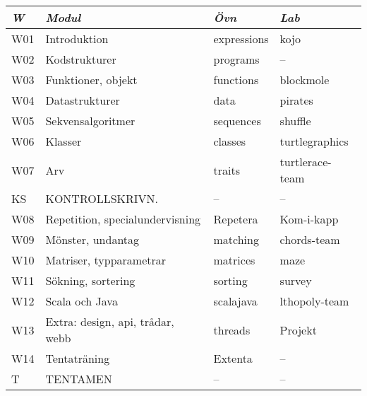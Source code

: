 \begin{tabular}{l|l|l|l}
\textit{W} & \textit{Modul} & \textit{Övn} & \textit{Lab} \\ \hline \hline
W01 & Introduktion & expressions & kojo \\
W02 & Kodstrukturer & programs & -- \\
W03 & Funktioner, objekt & functions & blockmole \\
W04 & Datastrukturer & data & pirates \\
W05 & Sekvensalgoritmer & sequences & shuffle \\
W06 & Klasser & classes & turtlegraphics \\
W07 & Arv & traits & turtlerace-team \\
KS & KONTROLLSKRIVN. & -- & -- \\
W08 & Repetition, specialundervisning & Repetera & Kom-i-kapp \\
W09 & Mönster, undantag & matching & chords-team \\
W10 & Matriser, typparametrar & matrices & maze \\
W11 & Sökning, sortering & sorting & survey \\
W12 & Scala och Java & scalajava & lthopoly-team \\
W13 & Extra: design, api, trådar, webb & threads & Projekt \\
W14 & Tentaträning & Extenta & -- \\
T & TENTAMEN & -- & -- \\
\end{tabular}
